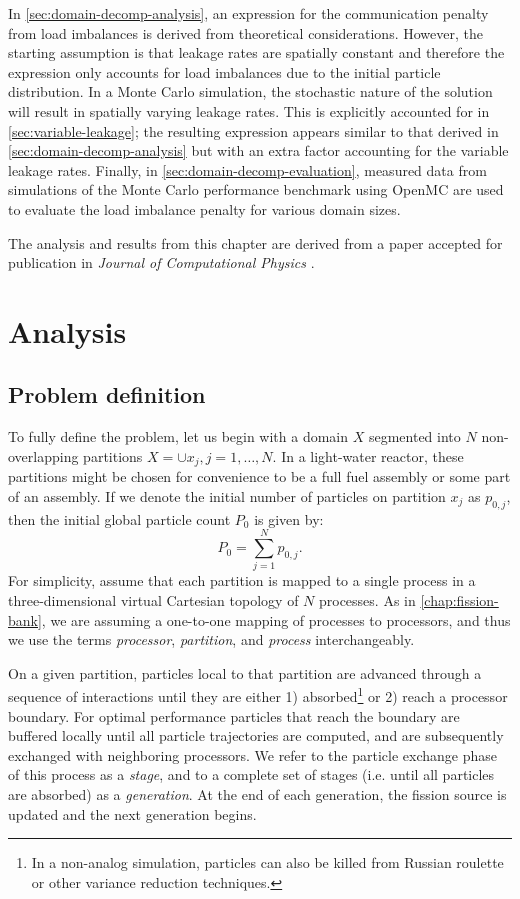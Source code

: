 In \autoref{sec:domain-decomp-analysis}, an expression for the communication
penalty from load imbalances is derived from theoretical
considerations. However, the starting assumption is that leakage rates are
spatially constant and therefore the expression only accounts for load
imbalances due to the initial particle distribution. In a Monte Carlo
simulation, the stochastic nature of the solution will result in spatially
varying leakage rates. This is explicitly accounted for in
\autoref{sec:variable-leakage}; the resulting expression appears similar to that
derived in \autoref{sec:domain-decomp-analysis} but with an extra factor
accounting for the variable leakage rates. Finally, in
\autoref{sec:domain-decomp-evaluation}, measured data from simulations of the
Monte Carlo performance benchmark using OpenMC are used to evaluate the load
imbalance penalty for various domain sizes.

The analysis and results from this chapter are derived from a paper accepted for
publication in \emph{Journal of Computational Physics} \cite{jcp-siegel-2012-2}.

\section{Analysis}
\label{sec:domain-decomp-analysis}

\subsection{Problem definition}

To fully define the problem, let us begin with a domain $X$ segmented into $N$
non-overlapping partitions $X = \cup x_j, j=1,\dotsc,N$. In a light-water
reactor, these partitions might be chosen for convenience to be a full fuel
assembly or some part of an assembly. If we denote the initial number of
particles on partition $x_j$ as $p_{0,j}$, then the initial global particle
count $P_0$ is given by:
\begin{equation}
  \label{eq:globalP}
  P_0 = \sum_{j=1}^{N} p_{0,j}.
\end{equation}
For simplicity, assume that each partition is mapped to a single process in a
three-dimensional virtual Cartesian topology of $N$ processes. As in
\autoref{chap:fission-bank}, we are assuming a one-to-one mapping of processes
to processors, and thus we use the terms \emph{processor}, \emph{partition}, and
\emph{process} interchangeably.

On a given partition, particles local to that partition are advanced through a
sequence of interactions until they are either 1) absorbed\footnote{In a
  non-analog simulation, particles can also be killed from Russian roulette or
  other variance reduction techniques.} or 2) reach a processor boundary. For
optimal performance particles that reach the boundary are buffered locally until
all particle trajectories are computed, and are subsequently exchanged with
neighboring processors. We refer to the particle exchange phase of this process
as a \emph{stage}, and to a complete set of stages (i.e. until all particles are
absorbed) as a \emph{generation}. At the end of each generation, the fission
source is updated and the next generation begins.

